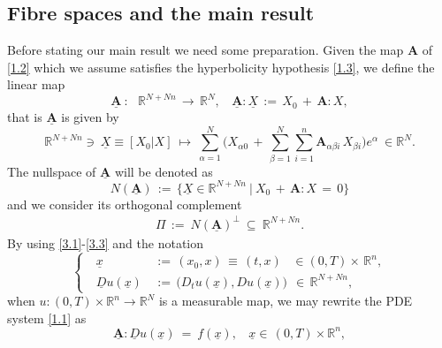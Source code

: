 \documentclass{amsart}
\theoremstyle{definition}
\numberwithin{equation}{section}
\begin{document}
\subsection{Fibre spaces and the main result} \label{subsection4.2} Before stating our main result we need some preparation. Given the map ${\textbf{A}}$ of \eqref{1.2} which we assume satisfies the hyperbolicity hypothesis \eqref{1.3}, we define the linear map
\begin{equation} \label{3.1}
{\underline{\textbf{A}}} \ :\ \ \ {\mathbb{R}}^{N +Nn}\, {\longrightarrow} \, {\mathbb{R}}^N, \ \ \ \ {\underline{\textbf{A}}} {\!:\!} \underline{X}\, :=\, X_0\, +\, {\textbf{A}}\!:\!X,
\end{equation}
that is ${\underline{\textbf{A}}}$ is given by
\[
{\mathbb{R}}^{N +Nn} \ni \ \underline{X} \equiv [X_0|X] \ {\longmapsto} \ \sum_{{\alpha}=1}^N\Bigg(X_{{\alpha} 0} \, +\, \sum_{{\beta}=1}^N\sum_{i=1}^n{\textbf{A}}_{{\alpha} {\beta} i}\, X_{{\beta} i}\Bigg) e^{\alpha} \ \in {\mathbb{R}}^N.
\]
The nullspace of ${\underline{\textbf{A}}}$ will be denoted as  
\begin{equation} \label{3.2}
N({\underline{\textbf{A}}})\, :=\, \Big\{\underline{X} \in {\mathbb{R}}^{N+Nn} \ \big| \ X_{ 0} \, +\, {\textbf{A}}{\!:\!} X \, =\, 0\Big\}
\end{equation}
and we consider its orthogonal complement
\begin{equation} \label{3.3}
\begin{split}
 \Pi \, :=\ N({\underline{\textbf{A}}})^\bot  \   {\subseteq}\  {\mathbb{R}}^{N +Nn}.
\end{split}
\end{equation}
By using \eqref{3.1}-\eqref{3.3} and the notation
\begin{equation}	 \label{3.4}
\left\{
\ \ \ \begin{split}
\underline{x} \, & :=\, (x_0,x)\, \equiv \, (t,x) \ \ \ \, \in (0,T){\times}\, {\mathbb{R}}^n, \\
{\underline{D}} u(\underline{x})\, & :=\, \big( D_tu(\underline{x}),  Du(\underline{x}) \big) \ \ \in \, {\mathbb{R}}^{N+Nn},
\end{split}
\right.
\end{equation}
when $u :  (0,T){\times} {\mathbb{R}}^n {\longrightarrow} {\mathbb{R}}^N$ is a measurable map, we may rewrite the PDE system \eqref{1.1} as
\begin{equation} \label{3.5}
{\underline{\textbf{A}}} {\!:\!} {\underline{D}} u(\underline{x})\ =\ f(\underline{x}), \ \ \ \ \underline{x}\in \, (0,T){\times}{\mathbb{R}}^n,
\end{equation}
\end{document}
